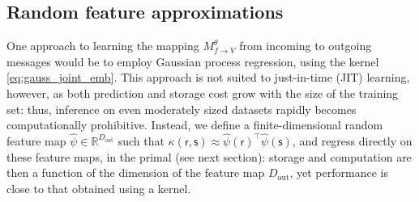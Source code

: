 \documentclass[english]{article}
\theoremstyle{plain}
\theoremstyle{plain}
\newcommand{\factor}{f}				%
\newcommand{\outV}{V}                         %
\newcommand{\approxMsg}[3]{M_{#1 \rightarrow #2}^{#3}}			%
\begin{document}
\subsection{Random feature approximations}
\label{sec:randomFeatureApproximations}

One approach to learning the mapping  $\approxMsg{\factor}{\outV}{\theta}$ from incoming to outgoing messages
would be to employ Gaussian process regression, using the kernel \eqref{eq:gauss_joint_emb}.
This approach is not suited to just-in-time (JIT) learning, however,
as both prediction and storage cost grow with the size of the training set:
thus, inference on even moderately sized datasets rapidly becomes computationally prohibitive.
Instead, we define 
a finite-dimensional random feature map $\hat{\psi} \in \mathbb{R}^{D_\mathrm{out}}$ such that 
$\kappa(\mathsf{r}, \mathsf{s}) \approx \hat{\psi}(\mathsf{r})^\top \hat{\psi}(\mathsf{s})$, 
and regress directly on these feature maps, in the primal (see next section): storage and computation 
are then a function of the dimension of the feature map $D_\mathrm{out}$, yet performance is close to that
obtained using a kernel.


\end{document}
